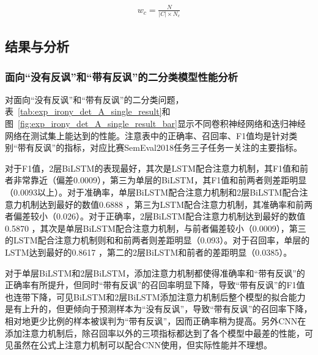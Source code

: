 \begin{align}
    \label{eq:class_weight}
    w_c = \frac{N}{|C| \times N_c}
\end{align}

\subsection{结果与分析}

\subsubsection{面向“没有反讽”和“带有反讽”的二分类模型性能分析}
\label{sssec:exp_irony_det_A_base}

对面向“没有反讽”和“带有反讽”的二分类问题，表~\ref{tab:exp_irony_det_A_single_result}和图~\ref{fig:exp_irony_det_A_single_result_bar}显示不同卷积神经网络和迭归神经网络在测试集上能达到的性能。注意表中的正确率、召回率、F1值均是针对类别“带有反讽”的指标，对应比赛SemEval2018任务三子任务一关注的主要指标。

对于F1值，2层BiLSTM的表现最好，其次是LSTM配合注意力机制，其F1值和前者非常靠近（偏差0.0009），第三为单层的BiLSTM，其F1值和前两者则差距明显（0.0093以上）。对于准确率，单层BiLSTM配合注意力机制和2层BiLSTM配合注意力机制达到最好的数值0.6888 ，第三为LSTM配合注意力机制，其准确率和前两者偏差较小（0.026）。对于正确率，2层BiLSTM配合注意力机制达到最好的数值0.5870 ，其次是单层BiLSTM配合注意力机制，与前者偏差较小（0.0009），第三的LSTM配合注意力机制则和和前两者则差距明显（0.093）。对于召回率，单层的LSTM达到最好的0.8617 ，第二的2层BiLSTM和前者的差距明显（0.0385）。

对于单层BiLSTM和2层BiLSTM，添加注意力机制都使得准确率和“带有反讽”的正确率有所提升，但同时“带有反讽”的召回率明显下降，导致“带有反讽”的F1值也连带下降，可见BiLSTM和2层BiLSTM添加注意力机制后整个模型的拟合能力是有上升的，但更倾向于预测样本为“没有反讽”，导致“带有反讽”的召回率下降，相对地更少比例的样本被误判为“带有反讽”，因而正确率稍为提高。另外CNN在添加注意力机制后，除召回率以外的三项指标都达到了各个模型中最差的性能，可见虽然在公式上注意力机制可以配合CNN使用，但实际性能并不理想。

